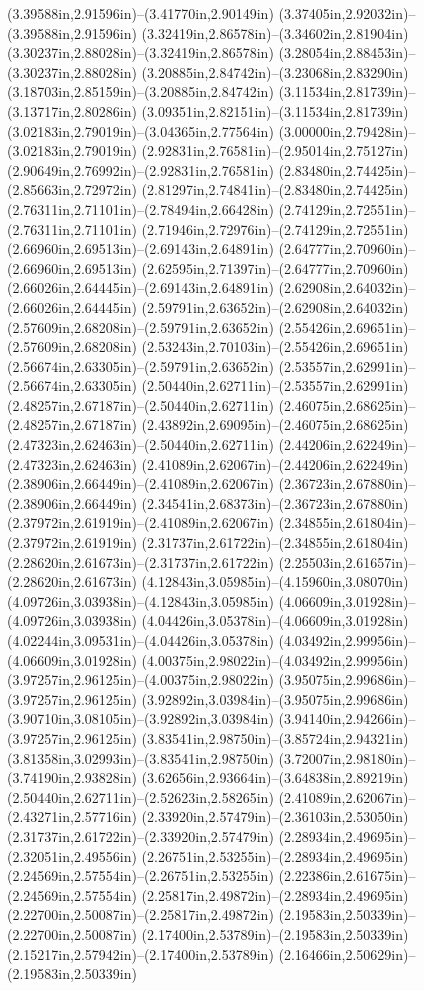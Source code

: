 (3.39588in,2.91596in)--(3.41770in,2.90149in) (3.37405in,2.92032in)--(3.39588in,2.91596in) (3.32419in,2.86578in)--(3.34602in,2.81904in) (3.30237in,2.88028in)--(3.32419in,2.86578in) (3.28054in,2.88453in)--(3.30237in,2.88028in) (3.20885in,2.84742in)--(3.23068in,2.83290in) (3.18703in,2.85159in)--(3.20885in,2.84742in) (3.11534in,2.81739in)--(3.13717in,2.80286in) (3.09351in,2.82151in)--(3.11534in,2.81739in) (3.02183in,2.79019in)--(3.04365in,2.77564in) (3.00000in,2.79428in)--(3.02183in,2.79019in) (2.92831in,2.76581in)--(2.95014in,2.75127in) (2.90649in,2.76992in)--(2.92831in,2.76581in) (2.83480in,2.74425in)--(2.85663in,2.72972in) (2.81297in,2.74841in)--(2.83480in,2.74425in) (2.76311in,2.71101in)--(2.78494in,2.66428in) (2.74129in,2.72551in)--(2.76311in,2.71101in) (2.71946in,2.72976in)--(2.74129in,2.72551in) (2.66960in,2.69513in)--(2.69143in,2.64891in) (2.64777in,2.70960in)--(2.66960in,2.69513in) (2.62595in,2.71397in)--(2.64777in,2.70960in) (2.66026in,2.64445in)--(2.69143in,2.64891in) (2.62908in,2.64032in)--(2.66026in,2.64445in) (2.59791in,2.63652in)--(2.62908in,2.64032in) (2.57609in,2.68208in)--(2.59791in,2.63652in) (2.55426in,2.69651in)--(2.57609in,2.68208in) (2.53243in,2.70103in)--(2.55426in,2.69651in) (2.56674in,2.63305in)--(2.59791in,2.63652in) (2.53557in,2.62991in)--(2.56674in,2.63305in) (2.50440in,2.62711in)--(2.53557in,2.62991in) (2.48257in,2.67187in)--(2.50440in,2.62711in) (2.46075in,2.68625in)--(2.48257in,2.67187in) (2.43892in,2.69095in)--(2.46075in,2.68625in) (2.47323in,2.62463in)--(2.50440in,2.62711in) (2.44206in,2.62249in)--(2.47323in,2.62463in) (2.41089in,2.62067in)--(2.44206in,2.62249in) (2.38906in,2.66449in)--(2.41089in,2.62067in) (2.36723in,2.67880in)--(2.38906in,2.66449in) (2.34541in,2.68373in)--(2.36723in,2.67880in) (2.37972in,2.61919in)--(2.41089in,2.62067in) (2.34855in,2.61804in)--(2.37972in,2.61919in) (2.31737in,2.61722in)--(2.34855in,2.61804in) (2.28620in,2.61673in)--(2.31737in,2.61722in) (2.25503in,2.61657in)--(2.28620in,2.61673in) (4.12843in,3.05985in)--(4.15960in,3.08070in) (4.09726in,3.03938in)--(4.12843in,3.05985in) (4.06609in,3.01928in)--(4.09726in,3.03938in) (4.04426in,3.05378in)--(4.06609in,3.01928in) (4.02244in,3.09531in)--(4.04426in,3.05378in) (4.03492in,2.99956in)--(4.06609in,3.01928in) (4.00375in,2.98022in)--(4.03492in,2.99956in) (3.97257in,2.96125in)--(4.00375in,2.98022in) (3.95075in,2.99686in)--(3.97257in,2.96125in) (3.92892in,3.03984in)--(3.95075in,2.99686in) (3.90710in,3.08105in)--(3.92892in,3.03984in) (3.94140in,2.94266in)--(3.97257in,2.96125in) (3.83541in,2.98750in)--(3.85724in,2.94321in) (3.81358in,3.02993in)--(3.83541in,2.98750in) (3.72007in,2.98180in)--(3.74190in,2.93828in) (3.62656in,2.93664in)--(3.64838in,2.89219in) (2.50440in,2.62711in)--(2.52623in,2.58265in) (2.41089in,2.62067in)--(2.43271in,2.57716in) (2.33920in,2.57479in)--(2.36103in,2.53050in) (2.31737in,2.61722in)--(2.33920in,2.57479in) (2.28934in,2.49695in)--(2.32051in,2.49556in) (2.26751in,2.53255in)--(2.28934in,2.49695in) (2.24569in,2.57554in)--(2.26751in,2.53255in) (2.22386in,2.61675in)--(2.24569in,2.57554in) (2.25817in,2.49872in)--(2.28934in,2.49695in) (2.22700in,2.50087in)--(2.25817in,2.49872in) (2.19583in,2.50339in)--(2.22700in,2.50087in) (2.17400in,2.53789in)--(2.19583in,2.50339in) (2.15217in,2.57942in)--(2.17400in,2.53789in) (2.16466in,2.50629in)--(2.19583in,2.50339in) 
